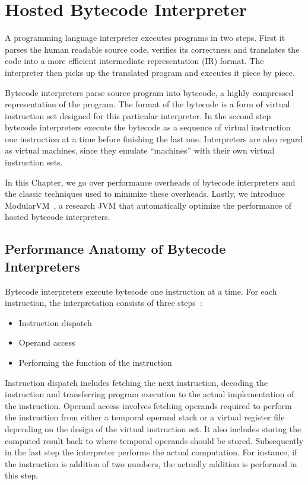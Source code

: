 \chapter{Hosted Bytecode Interpreter}

A programming language interpreter executes programs in two steps.
First it parses the human readable source code, verifies its correctness and translates the code into a more efficient intermediate representation (IR) format.
The interpreter then picks up the translated program and executes it piece by piece.

Bytecode interpreters parse source program into bytecode, a highly compressed representation of the program.
The format of the bytecode is a form of virtual instruction set designed for this particular interpreter.
In the second step bytecode interpreters execute the bytecode as a sequence of virtual instruction one instruction at a time before finishing the last one.
Interpreters are also regard as virtual machines, since they emulate ``machines'' with their own virtual instruction sets.

In this Chapter, we go over performance overheads of bytecode interpreters and the classic techniques used to minimize these overheads.
Lastly, we introduce ModularVM~\cite{savrun2013, savrun2014}, a research JVM that automatically optimize the performance of hosted bytecode interpreters.

\section{Performance Anatomy of Bytecode Interpreters}

Bytecode interpreters execute bytecode one instruction at a time.
For each instruction, the interpretation consists of three steps~\cite{davis2003case}:
\begin{itemize}
  \item Instruction dispatch
  \item Operand access
  \item Performing the function of the instruction
\end{itemize}
Instruction dispatch includes fetching the next instruction, decoding the instruction and transferring program execution to the actual implementation of the instruction.
Operand access involves fetching operands required to perform the instruction from either a temporal operand stack or a virtual register file depending on the design of the virtual instruction set.
It also includes storing the computed result back to where temporal operands should be stored.
Subsequently in the last step the interpreter performs the actual computation.
For instance, if the instruction is addition of two numbers, the actually addition is performed in this step.

